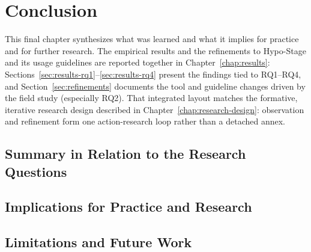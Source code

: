 
\chapter{Conclusion}
\label{ch:conclusion}
\label{chap:conclusion}

This final chapter synthesizes what was learned and what it implies for practice and for further research.
The empirical results and the refinements to Hypo-Stage and its usage guidelines are reported together in Chapter~\ref{chap:results}: Sections~\ref{sec:results-rq1}--\ref{sec:results-rq4} present the findings tied to RQ1--RQ4, and Section~\ref{sec:refinements} documents the tool and guideline changes driven by the field study (especially RQ2).
That integrated layout matches the formative, iterative research design described in Chapter~\ref{chap:research-design}: observation and refinement form one action-research loop rather than a detached annex.

\section{Summary in Relation to the Research Questions}
\label{sec:conclusion-rq-summary}


\section{Implications for Practice and Research}
\label{sec:conclusion-implications}


\section{Limitations and Future Work}
\label{sec:conclusion-limitations}

